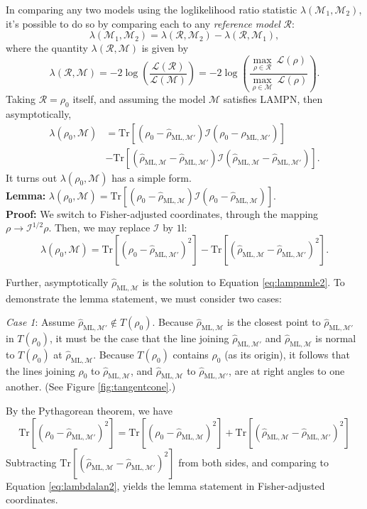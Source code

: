\documentclass[aps,pra, twocolumn]{revtex4-1}
\newcommand{\M}{\mathcal{M}}
\newcommand{\cL}{\mathcal{L}}
\newcommand{\Id}{\mathbb{I}}
\def\Id{1\!\mathrm{l}}
\newcommand{\rhohat}{\hat{\rho}}
\newcommand{\rhoML}[1]{\rhohat_{\scriptscriptstyle{\mathrm{ML},#1}}}
\begin{document}
In comparing any two models using the loglikelihood ratio statistic $\lambda(\M_{1}, \M_{2})$, it's possible to do so by comparing each to any \emph{reference model} $\mathcal{R}$: 
\[\lambda(\M_{1}, \M_{2}) = \lambda(\mathcal{R},\M_{2}) - \lambda(\mathcal{R},\M_{1}),\]
where the quantity $\lambda(\mathcal{R}, \M)$ is given by
\[\lambda(\mathcal{R}, \M) = -2 \log \left(\frac{\cL(\mathcal{R})}{\cL(\M)}\right) =  -2 \log \left(\frac{\underset{\rho \in \mathcal{R}}{\max}~\cL(\rho)}{\underset{\rho \in \M}{\max}~\cL(\rho)}\right).\]
Taking $\mathcal{R} = \rho_{0}$ itself, and assuming the model $\M$ satisfies LAMPN, then asymptotically,
\begin{align}
\label{eq:lambdalan}
\nonumber \lambda(\rho_{0}, \M) &= \mathrm{Tr}[(\rho_{0} - \rhoML{\M'})\mathcal{I}(\rho_{0} - \rhoML{\M'})]\\
&-  \mathrm{Tr}[(\rhoML{\M} - \rhoML{\M'})\mathcal{I}(\rhoML{\M} - \rhoML{\M'})].
\end{align}
It turns out $\lambda(\rho_{0}, \M)$ has a simple form.
~\\
\textbf{Lemma:} $\lambda(\rho_{0}, \M) = \mathrm{Tr}[(\rho_{0} - \rhoML{\M})\mathcal{I}(\rho_{0} - \rhoML{\M})]$.
~\\
\textbf{Proof:}
We switch to Fisher-adjusted coordinates, through the mapping $\rho \rightarrow \mathcal{I}^{1/2}\rho$. Then, we may replace $\mathcal{I}$ by $\Id$:
\begin{equation}
\label{eq:lambdalan2}
\lambda(\rho_{0}, \M) = \mathrm{Tr}[(\rho_{0} - \rhoML{\M'})^{2}]-  \mathrm{Tr}[(\rhoML{\M} - \rhoML{\M'})^{2}].
\end{equation}

Further, asymptotically $\rhoML{\M}$ is the solution to Equation \eqref{eq:lampnmle2}. To demonstrate the lemma statement, we must consider two cases:

\emph{Case 1}: Assume $\rhoML{\M'} \not \in T(\rho_{0})$. Because $\rhoML{\M}$ is the closest point to $\rhoML{\M'}$ in $T(\rho_{0})$, it must be the case that the line joining $\rhoML{\M'}$ and $\rhoML{\M}$ is normal to $T(\rho_{0})$ at $\rhoML{\M}$. Because $T(\rho_{0})$ contains $\rho_{0}$ (as its origin), it follows that the lines joining $\rho_{0}$ to $\rhoML{\M}$, and $\rhoML{\M}$ to $\rhoML{\M'}$, are at right angles to one another. (See Figure \ref{fig:tangentcone}.)

 By the Pythagorean theorem, we have
\[\mathrm{Tr}[(\rho_{0} -\rhoML{\M'})^{2}] =  \mathrm{Tr}[(\rho_{0} - \rhoML{\M})^{2}] + \mathrm{Tr}[(\rhoML{\M} - \rhoML{\M'})^{2}]\]
Subtracting $\mathrm{Tr}[(\rhoML{\M} - \rhoML{\M'})^{2}]$ from both sides, and comparing to Equation \eqref{eq:lambdalan2}, yields the lemma statement in Fisher-adjusted coordinates.
\end{document}
